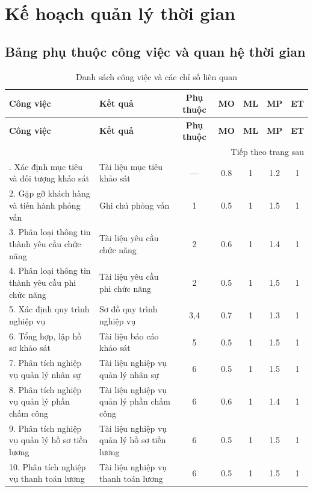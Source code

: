\section{Kế hoạch quản lý thời gian}
\subsection{Bảng phụ thuộc công việc và quan hệ thời gian}
\begin{longtable}{|p{5cm}|p{5cm}|c|c|c|c|c|}
    \caption{Danh sách công việc và các chỉ số liên quan} \\ \hline
    \textbf{Công việc} & \textbf{Kết quả} & \textbf{Phụ thuộc} & \textbf{MO} & \textbf{ML} & \textbf{MP} & \textbf{ET} \\ \hline
    \endfirsthead
    \hline
    \textbf{Công việc} & \textbf{Kết quả} & \textbf{Phụ thuộc} & \textbf{MO} & \textbf{ML} & \textbf{MP} & \textbf{ET} \\ \hline
    \endhead
    \hline \multicolumn{7}{|r|}{{Tiếp theo trang sau}} \\ \hline
    \endfoot
    \hline
    \endlastfoot
    1. Xác định mục tiêu và đối tượng khảo sát & Tài liệu mục tiêu khảo sát & — & 0.8 & 1 & 1.2 & 1 \\ \hline
    2. Gặp gỡ khách hàng và tiến hành phỏng vấn & Ghi chú phỏng vấn & 1 & 0.5 & 1 & 1.5 & 1 \\ \hline
    3. Phân loại thông tin thành yêu cầu chức năng & Tài liệu yêu cầu chức năng & 2 & 0.6 & 1 & 1.4 & 1 \\ \hline
    4. Phân loại thông tin thành yêu cầu phi chức năng & Tài liệu yêu cầu phi chức năng & 2 & 0.5 & 1 & 1.5 & 1 \\ \hline
    5. Xác định quy trình nghiệp vụ & Sơ đồ quy trình nghiệp vụ & 3,4 & 0.7 & 1 & 1.3 & 1 \\ \hline
    6. Tổng hợp, lập hồ sơ khảo sát & Tài liệu báo cáo khảo sát & 5 & 0.5 & 1 & 1.5 & 1 \\ \hline
    7. Phân tích nghiệp vụ quản lý nhân sự & Tài liệu nghiệp vụ quản lý nhân sự & 6 & 0.5 & 1 & 1.5 & 1 \\ \hline
    8. Phân tích nghiệp vụ quản lý phần chấm công & Tài liệu nghiệp vụ quản lý phần chấm công & 6 & 0.6 & 1 & 1.4 & 1 \\ \hline
    9. Phân tích nghiệp vụ quản lý hồ sơ tiền lương & Tài liệu nghiệp vụ quản lý hồ sơ tiền lương & 6 & 0.5 & 1 & 1.5 & 1 \\ \hline
    10. Phân tích nghiệp vụ thanh toán lương & Tài liệu nghiệp vụ thanh toán lương & 6 & 0.5 & 1 & 1.5 & 1 \\ \hline

\end{longtable}
